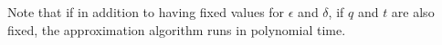 Note that if in addition to having fixed values for $\epsilon$ and $\delta$, 
if $q$ and $t$ are also fixed,
the approximation algorithm runs in polynomial time.










